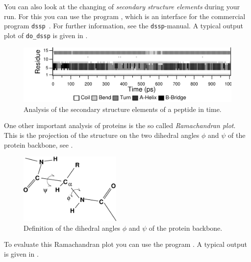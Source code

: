 You can also look at the changing of {\em secondary structure elements} 
during your run. For this you can use the program {\tt {}}, which is 
an interface for the commercial program {\tt dssp}~\cite{Kabsch83}. For 
further information, see the {\tt dssp}-manual. A typical output plot of 
{\tt do\_dssp} is given in .

\begin{figure}
\centerline{
\includegraphics[width=12cm]{plots/dssp}}
\caption{Analysis of the secondary structure elements of a peptide in time.}
\label{fig:dssp}
\end{figure}

One other important analysis of proteins is the so called 
{\em Ramachandran plot}. 
This is the projection of the structure on the two dihedral angles $\phi$ and 
$\psi$ of the protein backbone, see .

\begin{figure}
\centerline{
\includegraphics[width=5cm]{plots/phipsi}}
\caption{Definition of the dihedral angles $\phi$ and $\psi$ of the protein backbone.}
\label{fig:phipsi}
\end{figure}

To evaluate this Ramachandran plot you can use the program {\tt {}}. 
A typical output is given in .

